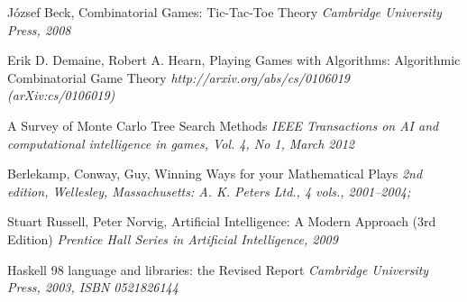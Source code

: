 \begin{thebibliography}{9}


József Beck, Combinatorial Games: Tic-Tac-Toe Theory
\emph{Cambridge University Press, 2008}

Erik D. Demaine, Robert A. Hearn, Playing Games with Algorithms: Algorithmic Combinatorial Game Theory
\emph{http://arxiv.org/abs/cs/0106019 (arXiv:cs/0106019)}

A Survey of Monte Carlo Tree Search Methods
\emph{IEEE Transactions on AI and computational intelligence in games, Vol. 4, No 1, March 2012}

Berlekamp, Conway, Guy, Winning Ways for your Mathematical Plays
\emph{2nd edition, Wellesley, Massachusetts: A. K. Peters Ltd., 4 vols., 2001–2004;}

Stuart Russell, Peter Norvig, Artificial Intelligence: A Modern Approach (3rd Edition) 
\emph{Prentice Hall Series in Artificial Intelligence, 2009}

Haskell 98 language and libraries: the Revised Report
\emph{Cambridge University Press, 2003, ISBN 0521826144}

\end{thebibliography}
